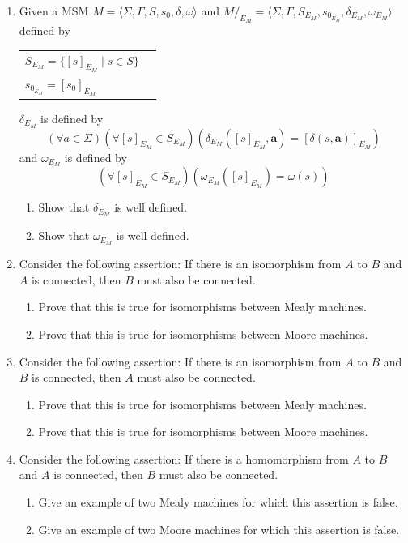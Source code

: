 \begin{enumerate}[{7.}1.]
\item Given a MSM $M=\langle\Sigma,\Gamma,S,s_0,\delta,\omega\rangle$ and
$M/  _{E_M}=\langle\Sigma,\Gamma,S_{E_M},s_{0_{E_M}},\delta_{E_M},\omega_{E_M}
\rangle$ defined by
\begin{center}\begin{tabular}{ll}
$S_{E_M} =\{[s]_{E_M} \mid s \in S\}$ \\
$s_{0_{E_M}} = [s_0]_{E_M}$
\end{tabular}\end{center}
$\delta_{E_M}$ is defined by
\[ (\forall a \in \Sigma)(\forall [s]_{E_M} \in S_{E_M})(\delta_{E_M}([s]_{E_M},
	\pmb{a}) = [\delta(s,\pmb{a})]_{E_M}) \]
and $\omega_{E_M}$ is defined by
\[ (\forall [s]_{E_M} \in S_{E_M})(\omega_{E_M}([s]_{E_M}) = \omega(s)) \]
\begin{enumerate}
\item Show that $\delta_{E_M}$ is well defined.
\item Show that $\omega_{E_M}$ is well defined.
\end{enumerate}

\item Consider the following assertion: If there is an isomorphism from $A$ to
$B$ and $A$ is connected, then $B$ must also be connected.
\begin{enumerate}
\item Prove that this is true for isomorphisms between Mealy machines.
\item Prove that this is true for isomorphisms between Moore machines.
\end{enumerate}

\item Consider the following assertion: If there is an isomorphism from $A$ to
$B$ and $B$ is connected, then $A$ must also be connected.
\begin{enumerate}
\item Prove that this is true for isomorphisms between Mealy machines.
\item Prove that this is true for isomorphisms between Moore machines.
\end{enumerate}

\item Consider the following assertion: If there is a homomorphism from $A$ to
$B$ and $A$ is connected, then $B$ must also be connected.
\begin{enumerate}
\item Give an example of two Mealy machines for which this assertion is false.
\item Give an example of two Moore machines for which this assertion is false.
\end{enumerate}


\end{enumerate}
